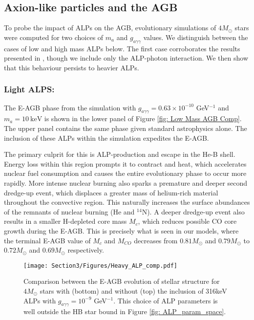 \subsection{Axion-like particles and the AGB}

To probe the impact of ALPs on the AGB, evolutionary simulations of $4M_{\odot}$ stars were computed for two choices of $m_a$ and $g_{a\gamma\gamma}$ values. We distinguish between the cases of low and high mass ALPs below. The first case corroborates the results presented in \cite{Dominguez}, though we include only the ALP-photon interaction. We then show that this behaviour persists to heavier ALPs.



\subsubsection*{Light ALPS:}


The E-AGB phase from the simulation with $g_{a\gamma\gamma}=0.63\times10^{-10}$ GeV$^{-1}$ and $m_a=10\ \mathrm{keV}$ is shown in the lower panel of Figure \ref{fig: Low Mass AGB Comp}. The upper panel contains the same phase given standard astrophysics alone. The inclusion of these ALPs within the simulation expedites the E-AGB. 


The primary culprit for this is ALP-production and escape in the He-B shell. Energy loss within this region prompts it to contract and heat, which accelerates nuclear fuel consumption and causes the entire evolutionary phase to occur more rapidly. More intense nuclear burning also sparks a premature and deeper second dredge-up event, which displaces a greater mass of helium-rich material throughout the convective region. This naturally increases the surface abundances of the remnants of nuclear burning (He and $^{14}$N). A deeper dredge-up event also results in a smaller H-depleted core mass $M_c$, which reduces possible CO core growth during the E-AGB. This is precisely what is seen in our models, where the terminal E-AGB value of $M_c$ and $M_{CO}$ decreases from $0.81M_{\odot}$ and $0.79M_{\odot}$ to $0.72M_{\odot}$ and $0.69M_{\odot}$ respectively.

\begin{figure}[t]
    \centering
    \texttt{[image: Section3/Figures/Heavy\_ALP\_comp.pdf]}
    \caption{Comparison between the E-AGB evolution of stellar structure for $4M_{\odot}$ stars with (bottom) and without (top) the inclusion of 316keV ALPs with $g_{a\gamma\gamma}=10^{-9}$ GeV$^{-1}$. This choice of ALP parameters is well outside the HB star bound in Figure \ref{fig: ALP_param_space}.}
    \label{fig: 4M comparison}
\end{figure}

